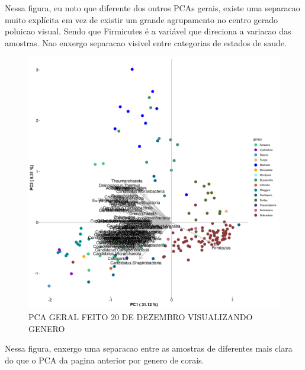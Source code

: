 \documentclass[12pt, a4paper]{report}
\begin{document}
Nessa figura, eu noto que diferente dos outros PCAs gerais, existe uma separacao muito explícita em vez de existir um grande agrupamento no centro gerado poluicao visual. Sendo que Firmicutes é a variável que direciona a variacao das amostras. Nao enxergo separacao visivel entre categorias de estados de saude.  	

\begin{figure}[H]
	\centering
	\includegraphics[scale=0.5]{figures/PCA_corais_genus_2018_12_20.png}
	\caption{PCA GERAL FEITO 20 DE DEZEMBRO VISUALIZANDO GENERO}
	\label{fig: PCAGERALFEITODIA20DEDEZEMBROVISUALIZANDOCATEGORIAGENERO}
\end{figure}

Nessa figura, enxergo uma separacao entre as amostras de diferentes mais clara do que o PCA da pagina anterior por genero de corais. 
\end{document}
